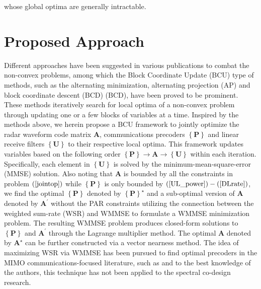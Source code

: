 \documentclass[9pt,journal]{IEEEtran}
\newcommand{\paren}[1]{\left({#1}\right)}
\newcommand{\braces}[1]{{\left\{ {#1}\right\}}}
\newcommand{\rr}{_\mathrm{r}}
\begin{document}
whose global optima are generally intractable\cite{Yu2006dualmethod}. 

\section{Proposed Approach}
\label{sec:solution}
Different approaches have been suggested in various publications to combat the non-convex problems, among which the Block Coordinate Update (BCU) type of methods, such as the alternating minimization\cite{Liu2017asilomar}, alternating projection (AP)\cite{nearestvector} and block coordinate descent (BCD) (BCD)\cite{FD_WMMSE}, have been proved to be prominent. These methods iteratively search for local optima of a non-convex problem through updating one or a few blocks of variables at a time\cite{BlockCoordinate}. Inspired by the methods above, we herein propose a BCU framework to jointly optimize the radar waveform code matrix $\mathbf{A}$, communications precoders $\braces{\mathbf{P}}$ and linear receive filters $\braces{\mathbf{U}}$ to their respective local optima. This framework updates variables based on the following order $\braces{\mathbf{P}}\rightarrow\mathbf{A}\rightarrow\braces{\mathbf{U}}$ within each iteration. Specifically, each element in $\braces{\mathbf{U}}$ is solved by the minimum-mean-square-error (MMSE) solution. Also noting that $\mathbf{A}$ is bounded by all the constraints in problem $\paren{\ref{jointop}}$ while $\braces{\mathbf{P}}$ is only bounded by $\paren{\mathrm{\ref{UL_power}}}-\paren{\mathrm{\ref{DLrate}}}$,  we find the optimal $\braces{\mathbf{P}}$ denoted by $\braces{\mathbf{P}}^\star$  and a sub-optimal version of $\mathbf{A}$ denoted by $\mathbf{A}^\prime$ without the PAR constraints utilizing the connection between the weighted sum-rate (WSR) and WMMSE to formulate a WMMSE minimization problem. The resulting WMMSE problem produces closed-form solutions to $\braces{\mathbf{P}}$ and $\mathbf{A}^\prime$ through the Lagrange multiplier method. The optimal $\mathbf{A}$ denoted by $\mathbf{A}^\star$ can be further constructed via a vector nearness method\cite{nearestvector}. The idea of maximizing WSR via WMMSE has been pursued to find optimal precoders in the MIMO communications-focused literature, such as \cite{WMMSEWSR,FD_WMMSE} and to the best knowledge of the authors, this technique has not been applied to the spectral co-design research.  
\iffalse
\end{document}
